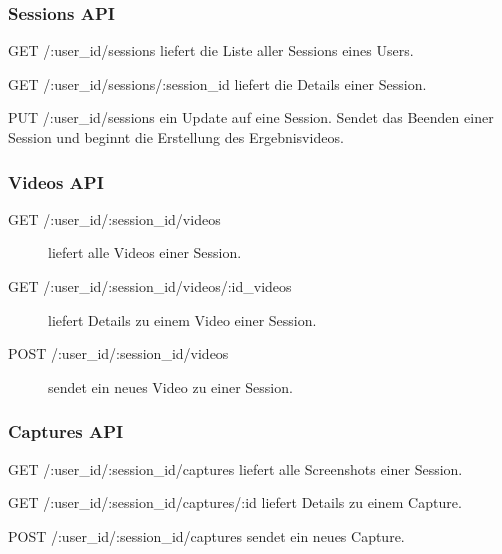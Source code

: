 \subsubsection{Sessions API}

\begin{compactdesc}
	\item[GET /:user\_id/sessions] liefert die Liste aller Sessions eines Users.
	
	\item[GET /:user\_id/sessions/:session\_id] liefert die Details einer Session. 
	
	\item[PUT /:user\_id/sessions] ein Update auf eine Session. Sendet das Beenden einer Session und beginnt die Erstellung des Ergebnisvideos.
\end{compactdesc}


\subsubsection{Videos API}

\begin{description}
	\item[GET /:user\_id/:session\_id/videos] liefert alle Videos einer Session.
	
	\item[GET /:user\_id/:session\_id/videos/:id\_videos] liefert Details zu einem Video einer Session.
	
	\item[POST /:user\_id/:session\_id/videos] sendet ein neues Video zu einer Session.
\end{description}


\subsubsection{Captures API}

\begin{compactdesc}
	\item[GET /:user\_id/:session\_id/captures] liefert alle Screenshots einer Session.
	
	\item[GET /:user\_id/:session\_id/captures/:id] liefert Details zu einem Capture.
	
	\item[POST /:user\_id/:session\_id/captures] sendet ein neues Capture.

\end{compactdesc}

